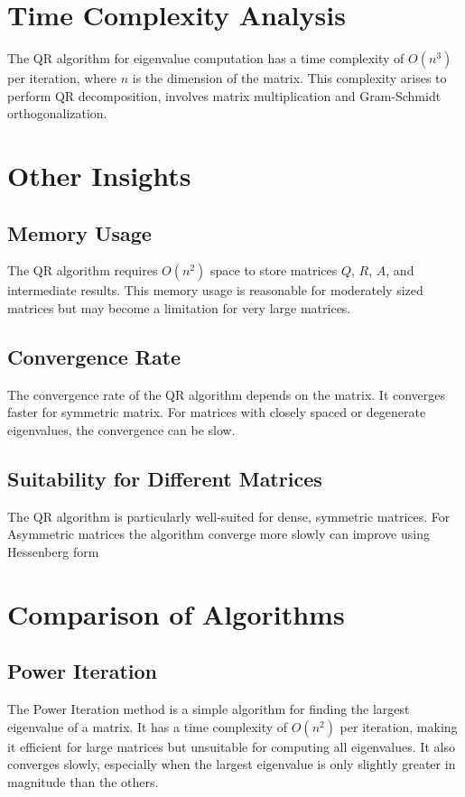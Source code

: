 \documentclass{article}
\theoremstyle{remark}
\begin{document}
\section{Time Complexity Analysis}
The QR algorithm for eigenvalue computation has a time complexity of $O(n^3)$ per iteration, where $n$ is the dimension of the matrix. This complexity arises to perform QR decomposition, involves matrix multiplication and Gram-Schmidt orthogonalization.


\section{Other Insights}
\subsection{Memory Usage}
The QR algorithm requires $O(n^2)$ space to store matrices $Q$, $R$, $A$, and intermediate results. This memory usage is reasonable for moderately sized matrices but may become a limitation for very large matrices.

\subsection{Convergence Rate}
The convergence rate of the QR algorithm depends on the matrix. It converges faster for symmetric matrix. For matrices with closely spaced or degenerate eigenvalues, the convergence can be slow.

\subsection{Suitability for Different Matrices}
The QR algorithm is particularly well-suited for dense, symmetric matrices. For Asymmetric  matrices the algorithm converge more slowly can improve using Hessenberg form

\section{Comparison of Algorithms}
\subsection{Power Iteration}
The Power Iteration method is a simple algorithm for finding the largest eigenvalue of a matrix. It has a time complexity of $O(n^2)$ per iteration, making it efficient for large matrices but unsuitable for computing all eigenvalues. It also converges slowly, especially when the largest eigenvalue is only slightly greater in magnitude than the others.
\end{document}
